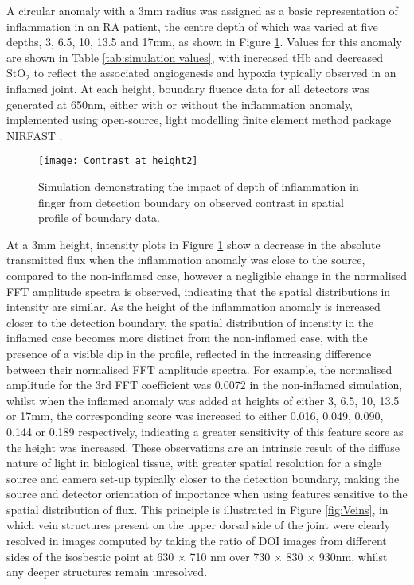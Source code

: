 \documentclass[twoside]{bhamthesis}
\theoremstyle{definition}
\begin{document}
A circular anomaly with a 3mm radius was assigned as a basic representation of inflammation in an RA patient, the centre depth of which was varied at five depths, 3, 6.5, 10, 13.5 and 17mm, as shown in Figure \ref{fig:contrast_at_height}. Values for this anomaly are shown in Table 
\ref{tab:simulation values}, with increased tHb and decreased $\mathrm{StO_2}$ to reflect the associated angiogenesis and hypoxia typically observed in an inflamed joint. At each height, boundary fluence data for all detectors was generated at 650nm, either with or without the inflammation anomaly, implemented using open-source, light modelling finite element method package NIRFAST \cite{dehghani2009near}. 

\begin{figure}[!ht]
\centering\texttt{[image: Contrast\_at\_height2]}
\caption{Simulation demonstrating the impact of depth of inflammation in finger from detection boundary on observed contrast in spatial profile of boundary data.}  \label{fig:contrast_at_height}
\end{figure}

At a 3mm height, intensity plots in Figure \ref{fig:contrast_at_height} show a decrease in the absolute transmitted flux when the inflammation anomaly was close to the source, compared to the non-inflamed case, however a negligible change in the normalised FFT amplitude spectra is observed, indicating that the spatial distributions in intensity are similar. As the height of the inflammation anomaly is increased closer to the detection boundary, the spatial distribution of intensity in the inflamed case becomes more distinct from the non-inflamed case, with the presence of a visible dip in the profile, reflected in the increasing difference between their normalised FFT amplitude spectra. For example, the normalised amplitude for the 3rd FFT coefficient was 0.0072 in the non-inflamed simulation, whilst when the inflamed anomaly was added at heights of either 3, 6.5, 10, 13.5 or 17mm, the corresponding score was increased to either 0.016, 0.049, 0.090, 0.144 or 0.189 respectively, indicating a greater sensitivity of this feature score as the height was increased. These observations are an intrinsic result of the diffuse nature of light in biological tissue, with greater spatial resolution for a single source and camera set-up typically closer to the detection boundary, making the source and detector orientation of importance when using features sensitive to the spatial distribution of flux. This principle is illustrated in Figure \ref{fig:Veins}, in which  vein structures present on the upper dorsal side of the joint were clearly resolved in images computed by taking the ratio of DOI images from different sides of the isosbestic point at 630 $\times$ 710 nm over 730 $\times$ 830 $\times$ 930nm, whilst any deeper structures remain unresolved. 
\end{document}
